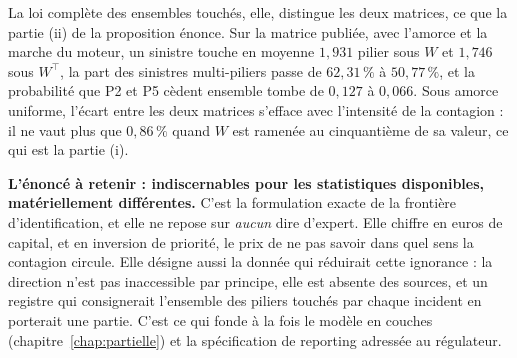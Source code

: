 La loi complète des ensembles touchés, elle, distingue les deux matrices, ce que la partie (ii) de
la proposition énonce. Sur la matrice publiée, avec l'amorce et la marche du moteur, un sinistre
touche en moyenne $1{,}931$ pilier sous $W$ et $1{,}746$ sous $W^\top$, la part des sinistres
multi-piliers passe de $62{,}31\,\%$ à $50{,}77\,\%$, et la probabilité que P2 et P5 cèdent
ensemble tombe de $0{,}127$ à $0{,}066$. Sous amorce uniforme, l'écart entre les deux matrices
s'efface avec l'intensité de la contagion : il ne vaut plus que $0{,}86\,\%$ quand $W$ est ramenée
au cinquantième de sa valeur, ce qui est la partie (i).

\begin{cle}
\textbf{L'énoncé à retenir : indiscernables pour les statistiques disponibles, matériellement
différentes.} C'est la formulation exacte de la frontière d'identification, et elle ne repose sur
\emph{aucun} dire d'expert. Elle chiffre en euros de capital, et en inversion de priorité, le
prix de ne pas savoir dans quel sens la contagion circule. Elle désigne aussi la donnée qui
réduirait cette ignorance : la direction n'est pas inaccessible par principe, elle est absente
des sources, et un registre qui consignerait l'ensemble des piliers touchés par chaque incident
en porterait une partie. C'est ce qui fonde à la fois le modèle en couches
(chapitre~\ref{chap:partielle}) et la spécification de reporting adressée au régulateur.
\end{cle}


